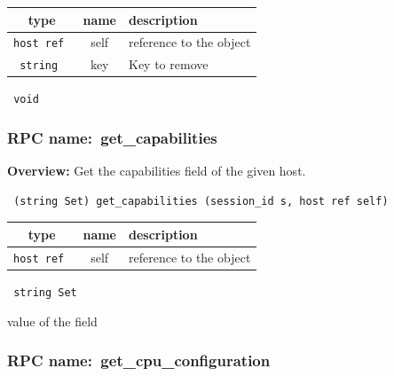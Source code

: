 
 
\vspace{0.3cm}
\begin{tabular}{|c|c|p{7cm}|}
 \hline
{\bf type} & {\bf name} & {\bf description} \\ \hline
{\tt host ref } & self & reference to the object \\ \hline 

{\tt string } & key & Key to remove \\ \hline 

\end{tabular}

\vspace{0.3cm}

{\tt 
void
}



\vspace{0.3cm}
\vspace{0.3cm}
\vspace{0.3cm}
\subsubsection{RPC name:~get\_capabilities}

{\bf Overview:} 
Get the capabilities field of the given host.

\begin{verbatim} (string Set) get_capabilities (session_id s, host ref self)\end{verbatim}



 
\vspace{0.3cm}
\begin{tabular}{|c|c|p{7cm}|}
 \hline
{\bf type} & {\bf name} & {\bf description} \\ \hline
{\tt host ref } & self & reference to the object \\ \hline 

\end{tabular}

\vspace{0.3cm}

{\tt 
string Set
}


value of the field
\vspace{0.3cm}
\vspace{0.3cm}
\vspace{0.3cm}
\subsubsection{RPC name:~get\_cpu\_configuration}

